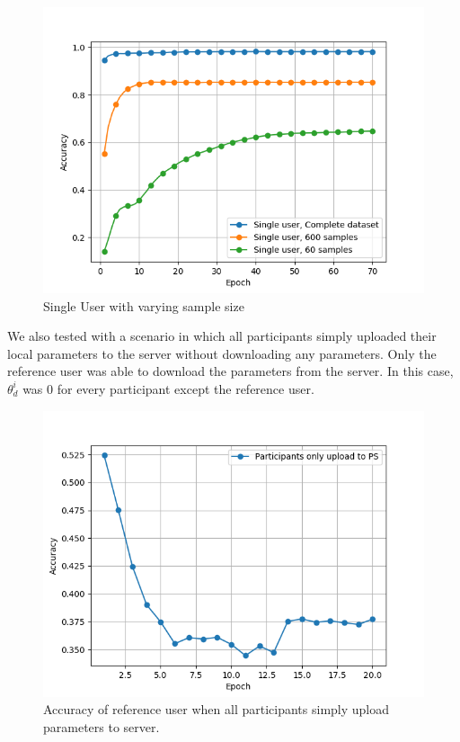 \documentclass[letterpaper]{article}
\begin{document}
\begin{flushleft}
{\begin{figure}[H]
  \centering
    \includegraphics[width=5in]{SingleUserBaselinesGrid.png}
    \caption[Accuracy of single user with varying sample size.]{\label{fig:SingleUser} Single User with varying sample size}
  \end{figure}




We also tested with a scenario in which all participants simply uploaded their local parameters to the server without downloading any parameters. Only the reference user was able to download the parameters from the server. In this case, $\theta_d^i$ was $0$ for every participant except the reference user.


\begin{figure}[H]
  \centering
    \includegraphics[width=5in]{AllUploadNoDownloadGrid.png}
    \caption[Accuracy graph where all participants upload.]{\label{fig:AllUploadNoDownloadGrid} Accuracy of reference user when all participants simply upload parameters to server.}
  \end{figure}


}
\end{flushleft}
\end{document}
